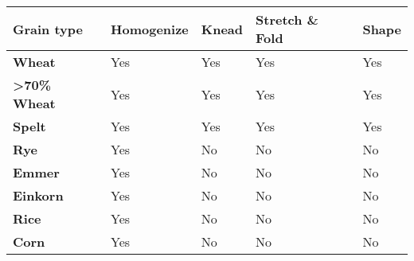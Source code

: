 


\begin{tabular}{lllll}
\toprule
\textbf{Grain type}              & \textbf{Homogenize} & \textbf{Knead} & \textbf{Stretch \& Fold} & \textbf{Shape} \\ \midrule
\textbf{Wheat}                   & Yes                 & Yes            & Yes                      & Yes            \\ \midrule
\textbf{\textgreater 70\% Wheat} & Yes                 & Yes            & Yes                      & Yes            \\ \midrule
\textbf{Spelt}                   & Yes                 & Yes            & Yes                      & Yes            \\ \midrule
\textbf{Rye}                     & Yes                 & No             & No                       & No             \\ \midrule
\textbf{Emmer}                   & Yes                 & No             & No                       & No             \\ \midrule
\textbf{Einkorn}                 & Yes                 & No             & No                       & No             \\ \midrule
\textbf{Rice}                    & Yes                 & No             & No                       & No             \\ \midrule
\textbf{Corn}                    & Yes                 & No             & No
                                 & No             \\ \bottomrule
\end{tabular}

